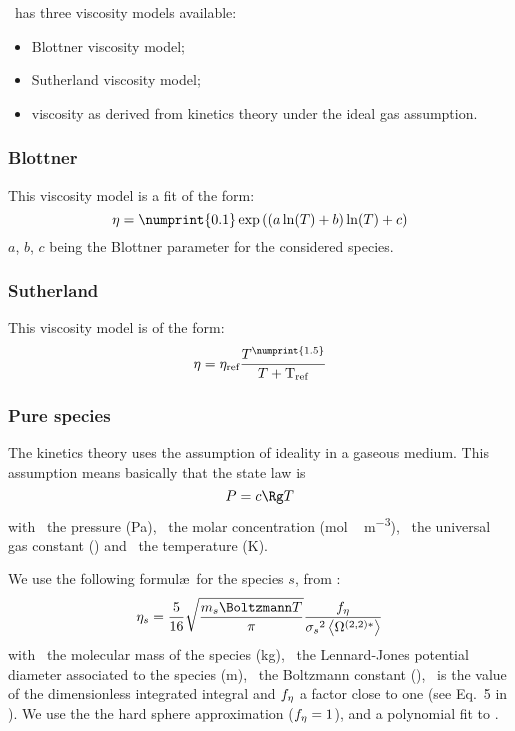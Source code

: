 \Antioch\ has three viscosity models available:
\begin{itemize}
\item Blottner viscosity model;
\item Sutherland viscosity model;
\item viscosity as derived from kinetics theory under the ideal gas assumption.
\end{itemize}

\subsubsection{Blottner}
\label{transport:viscosity:blottner}

This viscosity model is a fit of the form:
\begin{equation}
\vis = \numprint{0.1} \exp\left((a \ln(\Temp) + b) \ln(\Temp) + c\right)
\label{blottner:eq}
\end{equation}
$a$, $b$, $c$ being the Blottner parameter for the considered
species.

\subsubsection{Sutherland}
\label{transport:viscosity:sutherland}

This viscosity model is of the form:
\begin{equation}
\vis = \vis_\text{ref} \frac{\Temp^{\numprint{1.5}}}{\Temp + \text{T}_\text{ref}}
\label{sutherland:eq}
\end{equation}

\subsubsection{Pure species}
\label{transport:viscosity:pure_species}

The kinetics theory uses the assumption of ideality in a 
gaseous medium. This assumption means basically that the
state law is
\begin{equation}
\Press = \conc\Rg \Temp
\end{equation}
with \Press\ the pressure (\unit{Pa}), \conc\ the molar concentration
(\unit{mol\,m^{-3}}), \Rg\ the universal gas constant (\RgEquation)
and \Temp\ the temperature (\unit{K}).

We use the following formul\ae\ for the species $s$, from \citet{Monchick1961}:
\begin{equation}
\vis[s] = \frac{5}{16} \sqrt{\frac{\Mass[s]\Boltzmann\Temp}{\pi}}\frac{f_{\vis}}{\LJdia[s]^2\Stockmayer{2}}
\label{visc_kin_theory:eq}
\end{equation}
with \Mass\ the molecular mass of the species (\unit{kg}), \LJdia\ the Lennard-Jones
potential diameter associated to the species (\unit{m}), \Boltzmann\ the Boltzmann
constant (\BoltzmannEquation), \ is the
value of the dimensionless integrated integral and $f_{\vis}$ a factor close
to one (see Eq.~5 in \citet{Monchick1961}). We use the 
the hard sphere approximation ($f_{\vis} = 1$), and a polynomial fit to .
